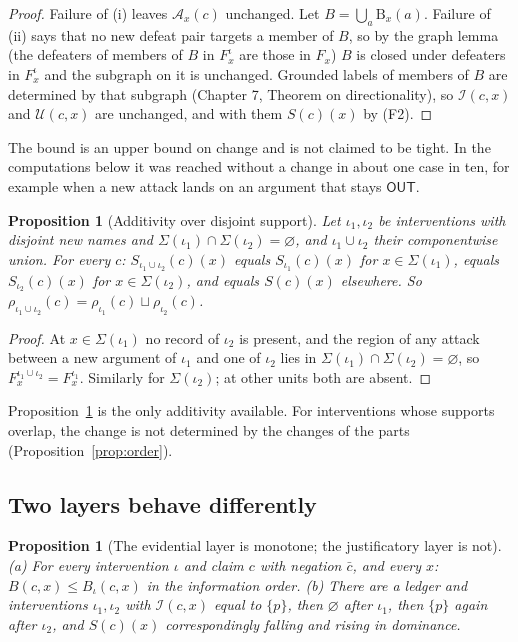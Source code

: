 \documentclass[11pt]{article}
\theoremstyle{plain}
\newtheorem{proposition}[theorem]{Proposition}
\theoremstyle{definition}
\theoremstyle{remark}
\newcommand{\OUT}{\textsf{OUT}}
\newcommand{\Bc}{\mathrm{B}}
\begin{document}
\begin{proof}
Failure of (i) leaves $\mathcal A_x(c)$ unchanged. Let $B=\bigcup_a\Bc_x(a)$. Failure of (ii) says that no new defeat pair targets a member of $B$, so by the graph lemma (the defeaters of members of $B$ in $F^\iota_x$ are those in $F_x$) $B$ is closed under defeaters in $F^\iota_x$ and the subgraph on it is unchanged. Grounded labels of members of $B$ are determined by that subgraph (Chapter 7, Theorem on directionality), so $\mathcal I(c,x)$ and $\mathcal U(c,x)$ are unchanged, and with them $S(c)(x)$ by (F2). \qedhere
\end{proof}

The bound is an upper bound on change and is not claimed to be tight. In the computations below it was reached without a change in about one case in ten, for example when a new attack lands on an argument that stays $\OUT$.

\begin{proposition}[Additivity over disjoint support]\label{prop:add}
Let $\iota_1,\iota_2$ be interventions with disjoint new names and $\Sigma(\iota_1)\cap\Sigma(\iota_2)=\varnothing$, and $\iota_1\cup\iota_2$ their componentwise union. For every $c$: $S_{\iota_1\cup\iota_2}(c)(x)$ equals $S_{\iota_1}(c)(x)$ for $x\in\Sigma(\iota_1)$, equals $S_{\iota_2}(c)(x)$ for $x\in\Sigma(\iota_2)$, and equals $S(c)(x)$ elsewhere. So $\rho_{\iota_1\cup\iota_2}(c)=\rho_{\iota_1}(c)\sqcup\rho_{\iota_2}(c)$.
\end{proposition}

\begin{proof}
At $x\in\Sigma(\iota_1)$ no record of $\iota_2$ is present, and the region of any attack between a new argument of $\iota_1$ and one of $\iota_2$ lies in $\Sigma(\iota_1)\cap\Sigma(\iota_2)=\varnothing$, so $F^{\iota_1\cup\iota_2}_x=F^{\iota_1}_x$. Similarly for $\Sigma(\iota_2)$; at other units both are absent. \qedhere
\end{proof}

Proposition~\ref{prop:add} is the only additivity available. For interventions whose supports overlap, the change is not determined by the changes of the parts (Proposition~\ref{prop:order}).

\subsection{Two layers behave differently}

\begin{proposition}[The evidential layer is monotone; the justificatory layer is not]\label{prop:layers}
(a) For every intervention $\iota$ and claim $c$ with negation $\bar c$, and every $x$: $B(c,x)\le B_\iota(c,x)$ in the information order. (b) There are a ledger and interventions $\iota_1,\iota_2$ with $\mathcal I(c,x)$ equal to $\{p\}$, then $\varnothing$ after $\iota_1$, then $\{p\}$ again after $\iota_2$, and $S(c)(x)$ correspondingly falling and rising in dominance.
\end{proposition}
\end{document}
